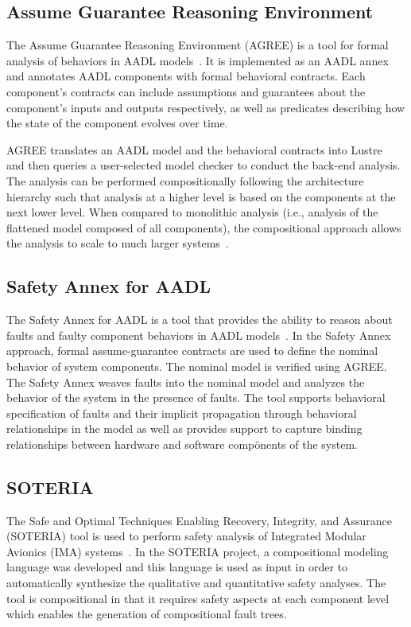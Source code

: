 \subsection{Assume Guarantee Reasoning Environment}
The Assume Guarantee Reasoning Environment (AGREE) is a tool for formal analysis of behaviors in AADL models~\cite{NFM2012:CoGaMiWhLaLu}.  It is implemented as an AADL annex and annotates AADL components with formal behavioral contracts. Each component's contracts can include assumptions and guarantees about the component's inputs and outputs respectively, as well as predicates describing how the state of the component evolves over time.

AGREE translates an AADL model and the behavioral contracts into Lustre~\cite{Halbwachs91:IEEE} and then queries a user-selected
model checker to conduct the back-end analysis. The analysis can be performed compositionally following the architecture hierarchy such that analysis at a higher level is based on the components at the next lower level.  When compared to monolithic analysis (i.e., analysis of the flattened model composed of all components), the compositional approach allows the analysis to scale to much larger systems~\cite{QFCS15:backes}. 

\subsection{Safety Annex for AADL}
The Safety Annex for AADL is a tool that provides the ability to reason about faults and faulty component behaviors in AADL models~\cite{Stewart17:IMBSA,SATechReport}. In the Safety Annex approach, formal assume-guarantee contracts are used to define the nominal behavior of system components. The nominal model is verified using AGREE. The Safety Annex weaves faults into the nominal model and analyzes the behavior of the system in the presence of faults. The tool supports behavioral specification of faults and their implicit propagation through behavioral relationships in the model as well as provides support to capture binding relationships between hardware and software compönents of the system. 

\subsection{SOTERIA}
The Safe and Optimal Techniques Enabling Recovery, Integrity, and Assurance (SOTERIA) tool is used to perform safety analysis of Integrated Modular Avionics (IMA) systems~\cite{SOTERIAproject}. In the SOTERIA project, a compositional modeling language was developed and this language is used as input in order to automatically synthesize the qualitative and quantitative safety analyses. The tool is compositional in that it requires safety aspects at each component level which enables the generation of compositional fault trees. 

